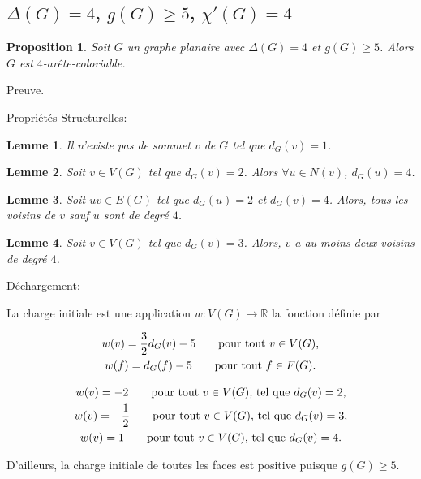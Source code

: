 \documentclass{beamer}
\newtheorem{lemme}{Lemme}
\newtheorem{proposition}{Proposition}
\begin{document}
\subsection{$\Delta(G)=4$, $g(G)\geq 5$, $\chi'(G)=4$}
\begin{frame}
\begin{proposition}
Soit $G$ un graphe planaire avec $\Delta(G) = 4$ et $g(G) \geq 5$. Alors $G$ est $4$-arête-coloriable.
\end{proposition}
Preuve.
\end{frame}

\begin{frame}
Propriétés Structurelles:
\begin{lemme}
Il n'existe pas de sommet $v$ de $G$ tel que $d_G(v) = 1$.
\label{le:14}
\end{lemme}
\end{frame}

\begin{frame}
\begin{lemme}
Soit $v \in V(G)$ tel que $d_G(v) = 2$. Alors $\forall u \in N(v)$, $d_G(u) = 4$.
\label{le:23}
\end{lemme} 
\end{frame}

\begin{frame}
\begin{lemme}
Soit $uv \in E(G)$ tel que $d_G(u) = 2$ et $d_G(v) = 4$. Alors, tous les voisins de $v$ sauf $u$ sont de degré $4$.
\label{le:243}
\end{lemme}
\end{frame}

\begin{frame}
\begin{lemme}
Soit $v \in V(G)$ tel que $d_G(v)=3$. Alors, $v$ a au moins deux voisins de degré $4$.
\label{le:333}
\end{lemme}
\end{frame}

\begin{frame}
Déchargement:

La charge initiale est une application  $w: V(G) \to \mathbb{R}$  la fonction définie par

$$
\gathered
w(v) = \frac{3}{2} d_G(v) - 5 \qquad \textrm{pour tout $v\in V(G)$,} \\
w(f) = d_G(f) - 5 \qquad \textrm{pour tout $f\in F(G)$.}
\endgathered
$$

\pause

$$
\gathered
w(v) = -2 \qquad \textrm{pour tout $v \in V(G)$, tel que } d_G(v) = 2,\\
w(v) = -\frac{1}{2} \qquad \textrm{pour tout $v \in V(G)$, tel que } d_G(v) = 3,\\
w(v) =  1 \qquad \textrm{pour tout $v \in V(G)$, tel que } d_G(v) = 4.
\endgathered
$$

D'ailleurs, la charge initiale de toutes les faces est positive puisque $g(G) \geq 5$.
\end{frame}
\end{document}
